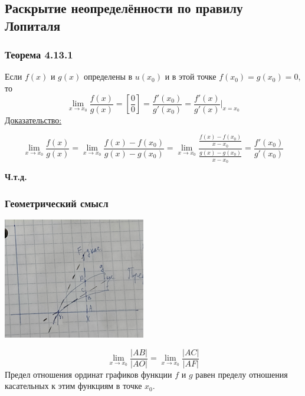 \documentclass[12pt]{article}
\begin{document}
    \subsection{Раскрытие неопределённости по правилу Лопиталя}
    \subsubsection*{Теорема 4.13.1}\label{th:4.13.1}
    Если $f(x)$ и $g(x)$ определены в $u(x_0)$ и в этой точке $f(x_0) = g(x_0) = 0$, то
    \[ \lim_{x\to x_0}\frac{f(x)}{g(x)} = \left[\frac{0}{0}\right] = \frac{f'(x_0)}{g'(x_0)} = \frac{f'(x)}{g'(x)}\Big|_{x = x_0} \]
    \underline{Доказательство:}
    \begin{adjustwidth}{1.5em}{1.5em}
        \[ \lim_{x \to x_0}\frac{f(x)}{g(x)} = \lim_{x\to x_0}\frac{f(x) - f(x_0)}{g(x) - g(x_0)} = \lim_{x\to x_0} \frac{\frac{f(x)-f(x_0)}{x - x_0}}{\frac{g(x) - g(x_0)}{x - x_0}} = \frac{f'(x_0)}{g'(x_0)} \]
        \begin{center}
            \textbf{Ч.т.д.}
        \end{center}
    \end{adjustwidth}
    
    \subsubsection*{Геометрический смысл}
    \begin{center}
        \includegraphics{4.13.1}
    \end{center}
    \[ \lim_{x\to x_0}\frac{|AB|}{|AO|} = \lim_{x\to x_0}\frac{|AC|}{|AF|} \]
    Предел отношения ординат графиков функции $f$ и $g$ равен пределу отношения касательных к этим функциям в точке $x_0$.
\end{document}
